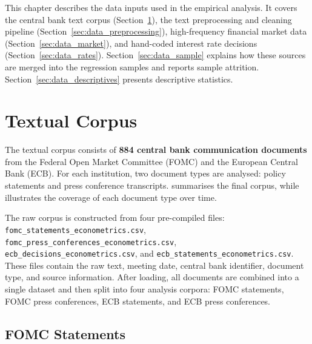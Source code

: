 
This chapter describes the data inputs used in the empirical analysis. It covers the
central bank text corpus (Section~\ref{sec:data_text}), the text preprocessing and
cleaning pipeline (Section~\ref{sec:data_preprocessing}), high-frequency financial
market data (Section~\ref{sec:data_market}), and hand-coded interest rate decisions
(Section~\ref{sec:data_rates}). Section~\ref{sec:data_sample} explains how these
sources are merged into the regression samples and reports sample attrition.
Section~\ref{sec:data_descriptives} presents descriptive statistics.


\section{Textual Corpus}
\label{sec:data_text}

The textual corpus consists of \textbf{884 central bank communication
documents} from the Federal Open Market Committee (FOMC) and the
European Central Bank (ECB). For each institution, two document types are
analysed: policy statements and press conference transcripts.
 summarises the final corpus, while
 illustrates the coverage of each document
type over time.



The raw corpus is constructed from four pre-compiled files:
\texttt{fomc\_statements\_econometrics.csv},
\texttt{fomc\_press\_conferences\_econometrics.csv},
\texttt{ecb\_decisions\_econometrics.csv}, and
\texttt{ecb\_statements\_econometrics.csv}. These files contain the raw
text, meeting date, central bank identifier, document type, and source
information. After loading, all documents are combined into a single
dataset and then split into four analysis corpora: FOMC statements, FOMC
press conferences, ECB statements, and ECB press conferences.

\subsection{FOMC Statements}
\label{sec:data_fomc_stmt}

